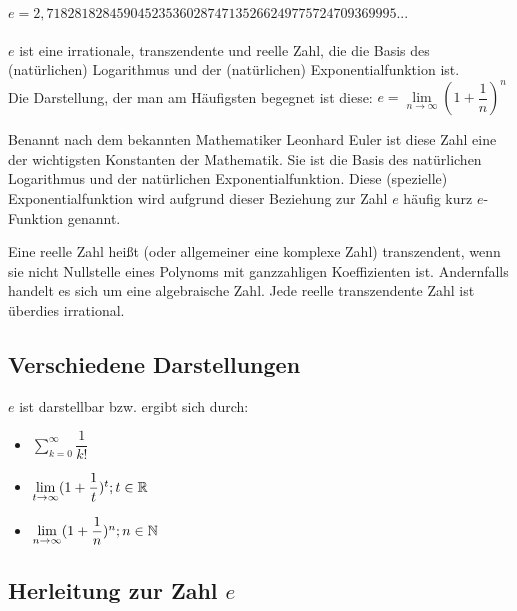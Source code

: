 \begin{Definition}
$e = 2,71828182845904523536028747135266249775724709369995...$\\
\\
$e$ ist eine irrationale, transzendente und reelle Zahl, die die Basis des (natürlichen) Logarithmus und der (natürlichen) Exponentialfunktion ist.\\
Die Darstellung, der man am Häufigsten begegnet ist diese:
$e=\lim\limits_{n\to \infty}(1+\dfrac{1}{n})^n$
\end{Definition}
Benannt nach dem bekannten Mathematiker Leonhard Euler ist diese Zahl eine der wichtigsten Konstanten der Mathematik.
Sie ist die Basis des natürlichen Logarithmus und der natürlichen Exponentialfunktion. Diese (spezielle) Exponentialfunktion wird aufgrund dieser Beziehung zur Zahl $e$ häufig kurz $e$-Funktion genannt.
\begin{Definition}
  Eine reelle Zahl heißt (oder allgemeiner eine komplexe Zahl) transzendent,
  wenn sie nicht Nullstelle eines Polynoms mit ganzzahligen Koeffizienten ist.
  Andernfalls handelt es sich um eine algebraische Zahl. Jede reelle transzendente Zahl ist überdies irrational.
\end{Definition}

	\subsection{Verschiedene Darstellungen}

$e$ ist darstellbar bzw. ergibt sich durch:
\begin{itemize}
\item $\sum\limits_{k=0}^{\infty}\dfrac{1}{k!}$
\item $\lim\limits_{t\to \infty}(1+\dfrac{1}{t})^t;t\in\mathbb{R}$
\item $\lim\limits_{n\to \infty}(1+\dfrac{1}{n})^n;n\in\mathbb{N}$
\end{itemize}

	\subsection{Herleitung zur Zahl $e$}

